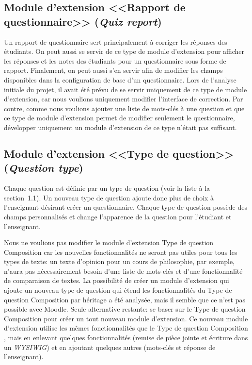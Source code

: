 \subsection{Module d'extension <<Rapport de questionnaire>> (\textit{Quiz report})}
Un rapport de questionnaire sert principalement \`a corriger les r\'eponses des \'etudiants.
On peut aussi se servir de ce type de module d'extension pour afficher les r\'eponses et les notes des \'etudiants pour un questionnaire sous forme de rapport.
Finalement, on peut aussi s'en servir afin de modifier les champs disponibles dans la configuration de base d'un questionnaire.
Lors de l'analyse initiale du projet, il avait \'et\'e pr\'evu de se servir uniquement de ce type de module d'extension, car nous voulions uniquement modifier l'interface de correction.
Par contre, comme nous voulions ajouter une liste de mots-cl\'es \`a une question et que ce type de module d'extension permet de modifier seulement le questionnaire, d\'evelopper uniquement un module d'extension de ce type n'\'etait pas suffisant.

\subsection{Module d'extension <<Type de question>> (\textit{Question type})}
Chaque question est d\'efinie par un type de question (voir la liste \`a la section~1.1).
Un nouveau type de question ajoute donc plus de choix \`a l'enseignant d\'esirant cr\'eer un questionnaire.
Chaque type de question poss\`ede des champs personnalis\'es et change l'apparence de la question pour l'\'etudiant et l'enseignant.

Nous ne voulions pas modifier le module d'extension \og Type de question Composition \fg{} car les nouvelles fonctionnalit\'es ne seront pas utiles pour tous les types de texte: un texte d'opinion pour un cours de philosophie, par exemple, n'aura pas n\'ecessairement besoin d'une liste de mots-cl\'es et d'une fonctionnalit\'e de comparaison de textes.
La possibilit\'e de cr\'eer un module d'extension qui ajoute un nouveau type de question qui \'etend les fonctionnalit\'es du \og Type de question Composition \fg{} par h\'eritage a \'et\'e analys\'ee, mais il semble que ce n'est pas possible avec Moodle.
Seule alternative restante: se baser sur le \og Type de question Composition \fg{} pour cr\'eer un tout nouveau module d'extension.
Ce nouveau module d'extension utilise les m\^emes fonctionnalit\'es que le \og Type de question Composition \fg{}, mais en enlevant quelques fonctionnalit\'es (remise de pi\`ece jointe et \'ecriture dans un \textit{WYSIWIG}) et en ajoutant quelques autres (mots-cl\'es et r\'eponse de l'enseignant).

